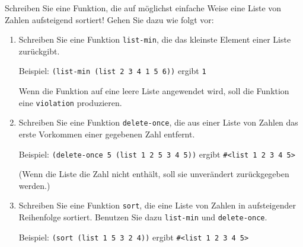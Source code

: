 \begin{aufgabe}
   Schreiben Sie eine Funktion, die auf möglichst
  einfache Weise eine Liste von Zahlen aufsteigend sortiert! Gehen
  Sie dazu wie folgt vor:

  \begin{enumerate}
  \item Schreiben Sie eine Funktion
    \texttt{list-min}, die das kleinste Element einer
    Liste zurückgibt.

    Beispiel: \verb|(list-min (list 2 3 4 1 5 6))| ergibt \verb|1|

    Wenn die Funktion auf eine leere Liste angewendet
    wird, soll die Funktion eine \texttt{violation} produzieren.
  \item Schreiben Sie eine Funktion
    \texttt{delete-once}, die aus einer Liste von Zahlen das erste
    Vorkommen einer gegebenen Zahl entfernt.

    Beispiel: \verb|(delete-once 5 (list 1 2 5 3 4 5))| ergibt
    \verb|#<list 1 2 3 4 5>|
    
    (Wenn die Liste die Zahl nicht enthält,
    soll sie unverändert zurückgegeben werden.)
  \item  Schreiben Sie eine Funktion \texttt{sort}, die
    eine Liste von Zahlen in aufsteigender Reihenfolge sortiert.
    Benutzen Sie dazu \texttt{list-min} und \texttt{delete-once}.

    Beispiel: \verb|(sort (list 1 5 3 2 4))| ergibt
    \verb|#<list 1 2 3 4 5>|

  \end{enumerate}
\end{aufgabe}

